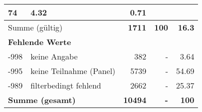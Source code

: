 \begin{longtable}{lXrrr}
       \num{74} &
       \num[round-mode=places,round-precision=2]{4.32} &
         \num[round-mode=places,round-precision=2]{0.71} \\
     \midrule
     \multicolumn{2}{l}{Summe (gültig)} &
       \textbf{\num{1711}} &
     \textbf{\num{100}} &
       \textbf{\num[round-mode=places,round-precision=2]{16.3}} \\
     \multicolumn{5}{l}{\textbf{Fehlende Werte}}\\
       -998 &
       keine Angabe &
         \num{382} &
        - &
         \num[round-mode=places,round-precision=2]{3.64} \\
       -995 &
       keine Teilnahme (Panel) &
         \num{5739} &
        - &
         \num[round-mode=places,round-precision=2]{54.69} \\
       -989 &
       filterbedingt fehlend &
         \num{2662} &
        - &
         \num[round-mode=places,round-precision=2]{25.37} \\
     \midrule
     \multicolumn{2}{l}{\textbf{Summe (gesamt)}} &
          \textbf{\num{10494}} &
        \textbf{-} &
        \textbf{\num{100}} \\
     \bottomrule
     \end{longtable}
     
